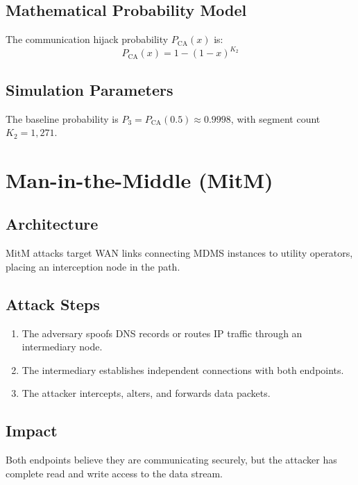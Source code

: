 \documentclass[12pt, oneside, a4paper]{report}
\theoremstyle{definition}
\theoremstyle{remark}
\newcommand{\Pca}{P_{\mathrm{CA}}}
\begin{document}
\subsection{Mathematical Probability Model}
The communication hijack probability $\Pca(x)$ is:
\begin{equation}
\Pca(x) = 1 - (1 - x)^{K_2}
\end{equation}

\subsection{Simulation Parameters}
The baseline probability is $P_3 = \Pca(0.5) \approx 0.9998$, with segment count $K_2 = 1{,}271$.

\bigskip

\section{Man-in-the-Middle (MitM)}
\label{sec:tm:mitm}

\subsection{Architecture}
MitM attacks target WAN links connecting MDMS instances to utility operators, placing an interception node in the path.

\subsection{Attack Steps}
\begin{enumerate}
  \item The adversary spoofs DNS records or routes IP traffic through an intermediary node.
  \item The intermediary establishes independent connections with both endpoints.
  \item The attacker intercepts, alters, and forwards data packets.
\end{enumerate}

\subsection{Impact}
Both endpoints believe they are communicating securely, but the attacker has complete read and write access to the data stream.
\end{document}
